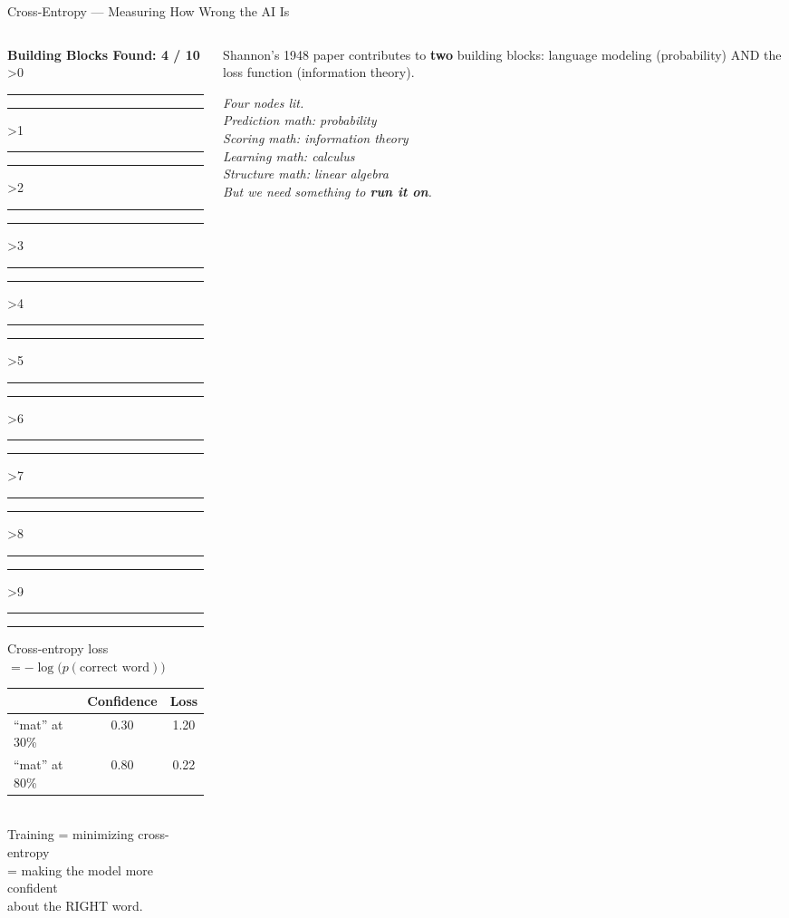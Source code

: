 \documentclass[aspectratio=169,12pt]{beamer}
\newcommand{\convergencebar}[1]{%
  \begin{tcolorbox}[colframe=aiViolet!60, colback=white, boxrule=0.5pt,
    width=\textwidth, left=2pt, right=2pt, top=2pt, bottom=2pt]
  \centering\small\textbf{Building Blocks Found: #1 / 10}\\[4pt]
  \ifnum#1>0 \textcolor{linalgTeal}{\rule{8pt}{8pt}}\else\textcolor{gray!30}{\rule{8pt}{8pt}}\fi\hspace{2pt}%
  \ifnum#1>1 \textcolor{calculusRed}{\rule{8pt}{8pt}}\else\textcolor{gray!30}{\rule{8pt}{8pt}}\fi\hspace{2pt}%
  \ifnum#1>2 \textcolor{probBlue}{\rule{8pt}{8pt}}\else\textcolor{gray!30}{\rule{8pt}{8pt}}\fi\hspace{2pt}%
  \ifnum#1>3 \textcolor{infoAmber}{\rule{8pt}{8pt}}\else\textcolor{gray!30}{\rule{8pt}{8pt}}\fi\hspace{2pt}%
  \ifnum#1>4 \textcolor{logicGray}{\rule{8pt}{8pt}}\else\textcolor{gray!30}{\rule{8pt}{8pt}}\fi\hspace{2pt}%
  \ifnum#1>5 \textcolor{approxGreen}{\rule{8pt}{8pt}}\else\textcolor{gray!30}{\rule{8pt}{8pt}}\fi\hspace{2pt}%
  \ifnum#1>6 \textcolor{neuronPink}{\rule{8pt}{8pt}}\else\textcolor{gray!30}{\rule{8pt}{8pt}}\fi\hspace{2pt}%
  \ifnum#1>7 \textcolor{seqIndigo}{\rule{8pt}{8pt}}\else\textcolor{gray!30}{\rule{8pt}{8pt}}\fi\hspace{2pt}%
  \ifnum#1>8 \textcolor{aiViolet}{\rule{8pt}{8pt}}\else\textcolor{gray!30}{\rule{8pt}{8pt}}\fi\hspace{2pt}%
  \ifnum#1>9 \textcolor{accentOrange}{\rule{8pt}{8pt}}\else\textcolor{gray!30}{\rule{8pt}{8pt}}\fi%
  \end{tcolorbox}
}
\begin{document}
\begin{frame}{Cross-Entropy --- Measuring How Wrong the AI Is}

  \begin{columns}[T]
    \begin{column}{0.52\textwidth}
      \convergencebar{4}

      \vspace{0.3em}
      \begin{tcolorbox}[colback=infoAmber!8, colframe=infoAmber,
        fonttitle=\bfseries\small, title={Shannon's Loss Function (1948)},
        rounded corners, boxrule=0.8pt, left=3pt, right=3pt, top=2pt, bottom=2pt]
        \small
        Cross-entropy loss $= -\log\bigl(p(\text{correct word})\bigr)$\\[6pt]
        \scriptsize
        \begin{tabular}{@{}lcc@{}}
          & \textbf{Confidence} & \textbf{Loss}\\
          \midrule
          ``mat'' at 30\% & 0.30 & 1.20\\
          ``mat'' at 80\% & 0.80 & 0.22\\
        \end{tabular}\\[6pt]
        Training = minimizing cross-entropy\\
        = making the model more confident\\about the RIGHT word.
      \end{tcolorbox}
    \end{column}

    \begin{column}{0.45\textwidth}
      \begin{insightbox}
        \small
        Shannon's 1948 paper contributes to \textbf{two} building blocks:
        language modeling (probability) AND the loss function (information theory).
      \end{insightbox}

      \vspace{0.3em}
      {\small\itshape Four nodes lit.\\[4pt]
       Prediction math: \textcolor{probBlue}{probability}\\
       Scoring math: \textcolor{infoAmber}{information theory}\\
       Learning math: \textcolor{calculusRed}{calculus}\\
       Structure math: \textcolor{linalgTeal}{linear algebra}\\[6pt]
       But we need something to \textbf{run it on}.}
    \end{column}
  \end{columns}


\end{frame}
\end{document}
